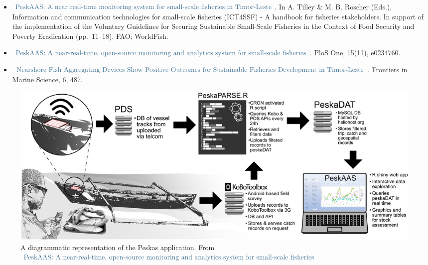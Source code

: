 \documentclass[
]{article}
\providecommand{\tightlist}{%
  \setlength{\itemsep}{0pt}\setlength{\parskip}{0pt}}
\begin{document}
\begin{itemize}
\tightlist
\item
  \href{https://www.fao.org/documents/card/en/c/cb2030en}{\(\color{myblue}{\text{PeskAAS: A near real-time monitoring system for small-scale fisheries in Timor-Leste}}\)}. In A. Tilley \& M. B. Roscher (Eds.), Information and communication technologies for small-scale fisheries (ICT4SSF) - A handbook for fisheries stakeholders. In support of the implementation of the Voluntary Guidelines for Securing Sustainable Small-Scale Fisheries in the Context of Food Security and Poverty Eradication (pp.~11--18). FAO; WorldFish.
\item
  \href{https://journals.plos.org/plosone/article?id=10.1371/journal.pone.0234760}{\(\color{myblue}{\text{PeskAAS: A near-real-time, open-source monitoring and analytics system for small-scale fisheries}}\)}. PloS One, 15(11), e0234760.
\item
  \href{https://www.frontiersin.org/articles/10.3389/fmars.2019.00487/full}{\(\color{myblue}{\text{Nearshore Fish Aggregating Devices Show Positive Outcomes for Sustainable Fisheries Development in Timor-Leste}}\)}. Frontiers in Marine Science, 6, 487.
\end{itemize}



\begin{figure}
\includegraphics[width=37.96in]{inst/report_files/flowchart} \caption{A diagrammatic representation of the Peskas application. From \href{https://journals.plos.org/plosone/article?id=10.1371/journal.pone.0234760}{\(\color{myblue}{\text{PeskAAS: A near-real-time, open-source monitoring and analytics system for small-scale fisheries}}\)}}\label{fig:flowchart}
\end{figure}
\pagebreak

\begingroup\fontsize{7}{9}\selectfont
\end{document}
